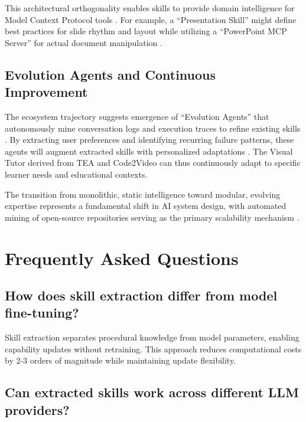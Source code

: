 \documentclass[11pt,a4paper]{article}
\begin{document}
This architectural orthogonality enables skills to provide domain intelligence for Model Context Protocol tools \cite{arxiv2024skillframework}. For example, a ``Presentation Skill'' might define best practices for slide rhythm and layout while utilizing a ``PowerPoint MCP Server'' for actual document manipulation \cite{arxiv2024skillframework, github2024pneumaskills}.

\subsection{Evolution Agents and Continuous Improvement}

The ecosystem trajectory suggests emergence of ``Evolution Agents'' that autonomously mine conversation logs and execution traces to refine existing skills \cite{lobehub2024selfimproving, github2024pneumaskills}. By extracting user preferences and identifying recurring failure patterns, these agents will augment extracted skills with personalized adaptations \cite{github2024pneumaskills}. The Visual Tutor derived from TEA and Code2Video can thus continuously adapt to specific learner needs and educational contexts.

The transition from monolithic, static intelligence toward modular, evolving expertise represents a fundamental shift in AI system design, with automated mining of open-source repositories serving as the primary scalability mechanism \cite{arxiv2024skillframework, mintlify2024skillmd}.

\section{Frequently Asked Questions}

\subsection{How does skill extraction differ from model fine-tuning?}

Skill extraction separates procedural knowledge from model parameters, enabling capability updates without retraining. This approach reduces computational costs by 2-3 orders of magnitude while maintaining update flexibility.

\subsection{Can extracted skills work across different LLM providers?}
\end{document}
